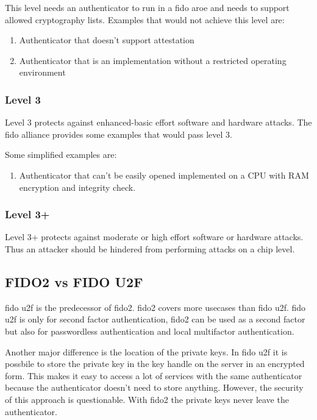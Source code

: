 \documentclass[a4paper, 11pt]{scrartcl}
\begin{document}
This level needs an authenticator to run in a \gls{fido} \gls{aroe} and needs to support allowed cryptography lists. Examples that would not achieve this level are: \cite{fido:authenticator:level2, fido:authenticator:allowedEnvironment}
\begin{enumerate}
  \item Authenticator that doesn't support attestation
  \item Authenticator that is an implementation without a restricted operating environment 
\end{enumerate}

\subsubsection{Level 3}
Level 3 protects against enhanced-basic effort software and hardware attacks. The \gls{fido} alliance provides some examples that would pass level 3. \cite{fido:authenticator:level3}

Some simplified examples are:
\begin{enumerate}
  \item Authenticator that can't be easily opened implemented on a CPU with RAM encryption and integrity check.
\end{enumerate}

\subsubsection{Level 3+}
Level 3+ protects against moderate or high effort software or hardware attacks. Thus an attacker should be hindered from performing attacks on a chip level. \cite{fido:authenticator:level3_plus}

\subsection{FIDO2 vs FIDO U2F}

\gls{fido} \gls{u2f} is the predecessor of \gls{fido2}. \gls{fido2} covers more usecases than \gls{fido} \gls{u2f}. \gls{fido} \gls{u2f} is only for second factor authentication, \gls{fido2} can be used as a second factor but also for passwordless authentication and local multifactor authentication. \cite{yubico:whatIsFido2}

Another major difference is the location of the private keys. In \gls{fido} \gls{u2f} it is possbile to store the private key in the key handle on the server in an encrypted form. This makes it easy to access a lot of services with the same authenticator because the authenticator doesn't need to store anything. However, the security of this approach is questionable. With \gls{fido2} the private keys never leave the authenticator. \cite{fido:u2fImplementationConsiderations, fido:howitworks}
\end{document}
